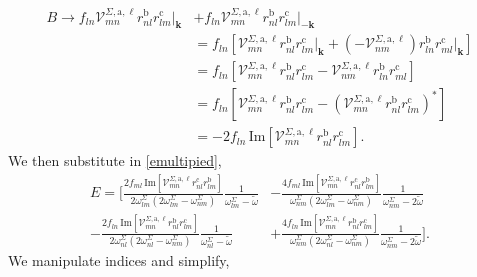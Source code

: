 \begin{align*}
B \rightarrow f_{ln}\mathcal{V}^{\Sigma,\text{a},\ell}_{mn}
    r^{\text{b}}_{nl}r^{\text{c}}_{lm}\vert_{\mathbf{k}}
&+  f_{ln}\mathcal{V}^{\Sigma,\text{a},\ell}_{mn}r^{\text{b}}_{nl}
    r^{\text{c}}_{lm}\vert_{-\mathbf{k}}\nonumber\\
&=  f_{ln}\left[\mathcal{V}^{\Sigma,\text{a},\ell}_{mn}
    r^{\text{b}}_{nl}r^{\text{c}}_{lm}\vert_{\mathbf{k}} 
+   \left(-\mathcal{V}^{\Sigma,\text{a},\ell}_{nm}\right)
    r^{\text{b}}_{ln}r^{\text{c}}_{ml}\vert_{\mathbf{k}}\right]\nonumber\\
&=  f_{ln}\left[\mathcal{V}^{\Sigma,\text{a},\ell}_{mn}
    r^{\text{b}}_{nl}r^{\text{c}}_{lm} 
-   \mathcal{V}^{\Sigma,\text{a},\ell}_{nm}
    r^{\text{b}}_{ln}r^{\text{c}}_{ml}\right]\nonumber\\
&=  f_{ln}\left[\mathcal{V}^{\Sigma,\text{a},\ell}_{mn}
    r^{\text{b}}_{nl}r^{\text{c}}_{lm}
-   \left(\mathcal{V}^{\Sigma,\text{a},\ell}_{mn}
    r^{\text{b}}_{nl}r^{\text{c}}_{lm}\right)^{*}\right]\nonumber\\
&= -2f_{ln}\,\mathrm{Im}\left[\mathcal{V}^{\Sigma,\text{a},\ell}_{mn}
    r^{\text{b}}_{nl}r^{\text{c}}_{lm}\right].
\end{align*}
We then substitute in \eqref{emultipied},
\begin{align*}
E =  
\Bigg[
  \frac{2f_{ml}\,\mathrm{Im}\left[\mathcal{V}^{\Sigma,\text{a},\ell}_{mn}
        r^{\text{c}}_{nl}
        r^{\text{b}}_{lm}\right]}
        {2\omega^\Sigma_{lm}(2\omega^\Sigma_{lm}-\omega^\Sigma_{nm})}
\frac{1}{\omega^\Sigma_{lm}-\tilde\omega}
&-\frac{4f_{ml}\,\mathrm{Im}\left[\mathcal{V}^{\Sigma,\text{a},\ell}_{mn}
        r^{\text{c}}_{nl}
        r^{\text{b}}_{lm}\right]}
        {\omega^\Sigma_{nm}(2\omega^\Sigma_{lm}-\omega^\Sigma_{nm})}
\frac{1}{\omega^\Sigma_{nm}-2\tilde\omega}\nonumber\\
-\frac{2f_{ln}\,\mathrm{Im}\left[\mathcal{V}^{\Sigma,\text{a},\ell}_{mn}
        r^{\text{b}}_{nl}
        r^{\text{c}}_{lm}\right]}
        {2\omega^\Sigma_{nl}(2\omega^\Sigma_{nl}-\omega^\Sigma_{nm})}
\frac{1}{\omega^\Sigma_{nl}-\tilde\omega}
&+\frac{4f_{ln}\,\mathrm{Im}\left[\mathcal{V}^{\Sigma,\text{a},\ell}_{mn}
        r^{\text{b}}_{nl}
        r^{\text{c}}_{lm}\right]}
        {\omega^\Sigma_{nm}(2\omega^\Sigma_{nl}-\omega^\Sigma_{nm})}
\frac{1}{\omega^\Sigma_{nm}-2\tilde\omega}
\Bigg]
.
\end{align*}
We manipulate indices and simplify,
